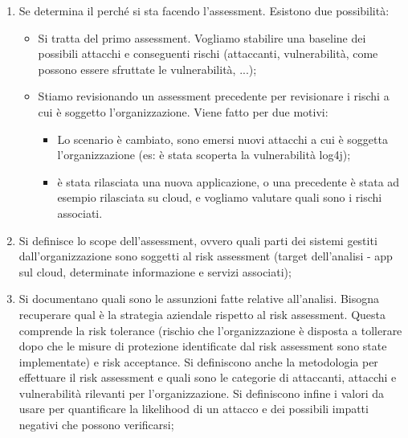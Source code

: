 \begin{enumerate}
    \item Se determina il perché si sta facendo l'assessment. Esistono due possibilità:
    \begin{itemize}
        \item Si tratta del primo assessment. Vogliamo stabilire una baseline dei possibili attacchi e conseguenti rischi (attaccanti, vulnerabilità, come possono essere sfruttate le vulnerabilità, ...);
        \item Stiamo revisionando un assessment precedente per revisionare i rischi a cui è soggetto l'organizzazione. Viene fatto per due motivi:
        \begin{itemize}
            \item Lo scenario è cambiato, sono emersi nuovi attacchi a cui è soggetta l'organizzazione (es: è stata scoperta la vulnerabilità log4j);
            \item è stata rilasciata una nuova applicazione, o una precedente è stata ad esempio rilasciata su cloud, e vogliamo valutare quali sono i rischi associati. 
        \end{itemize}
    \end{itemize}

    \item Si definisce lo scope dell'assessment, ovvero quali parti dei sistemi gestiti dall'organizzazione sono soggetti al risk assessment (target dell'analisi - app sul cloud, determinate informazione e servizi associati);

    \item Si documentano quali sono le assunzioni fatte relative all'analisi. Bisogna recuperare qual è la strategia aziendale rispetto al risk assessment. Questa comprende la risk tolerance (rischio che l'organizzazione è disposta a tollerare dopo che le misure di protezione identificate dal risk assessment sono state implementate) e risk acceptance. Si definiscono anche la metodologia per effettuare il risk assessment e quali sono le categorie di attaccanti, attacchi e vulnerabilità rilevanti per l'organizzazione. Si definiscono infine i valori da usare per quantificare la likelihood di un attacco e dei possibili impatti negativi che possono verificarsi;


\end{enumerate}
